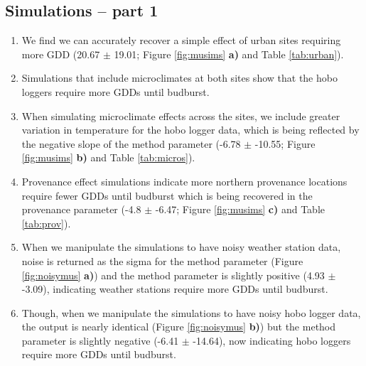 \documentclass{article}\usepackage[]{graphicx}\usepackage[]{color}
\begin{document}
\begin{enumerate}
\subsection*{Simulations -- part 1}
\begin{enumerate}
  \item We find we can accurately recover a simple effect of urban sites requiring more GDD (20.67 $\pm$ 19.01; Figure \ref{fig:musims} \textbf{a)} and Table \ref{tab:urban}).
  \item Simulations that include microclimates at both sites show that the hobo loggers require more GDDs until budburst. 
  \item When simulating microclimate effects across the sites, we include greater variation in temperature for the hobo logger data, which is being reflected by the negative slope of the method parameter (-6.78 $\pm$ -10.55; Figure \ref{fig:musims} \textbf{b)} and Table \ref{tab:micros}). 
  \item Provenance effect simulations indicate more northern provenance locations require fewer GDDs until budburst which is being recovered in the provenance parameter (-4.8 $\pm$ -6.47; Figure \ref{fig:musims} \textbf{c)} and Table \ref{tab:prov}).
  \item When we manipulate the simulations to have noisy weather station data, noise is returned as the sigma for the method parameter (Figure \ref{fig:noisymus} \textbf{a)}) and the method parameter is slightly positive (4.93 $\pm$ -3.09), indicating weather stations require more GDDs until budburst. 
  \item Though, when we manipulate the simulations to have noisy hobo logger data, the output is nearly identical (Figure \ref{fig:noisymus} \textbf{b)}) but the method parameter is slightly negative (-6.41 $\pm$ -14.64), now indicating hobo loggers require more GDDs until budburst.
  \end{enumerate}
  

\end{enumerate}
\end{document}
